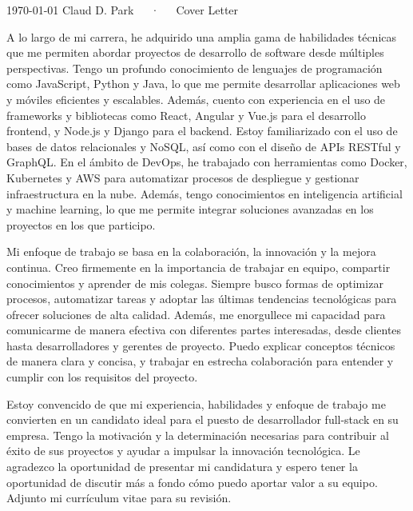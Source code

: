 \documentclass[11pt, a4paper]{awesome-cv}
\begin{document}
\makecvheader[R]

\makecvfooter
  {\today}
  {Claud D. Park~~~·~~~Cover Letter}
  {}

\makelettertitle

\begin{cvletter}

A lo largo de mi carrera, he adquirido una amplia gama de habilidades técnicas que me permiten abordar proyectos de desarrollo de software desde múltiples perspectivas. Tengo un profundo conocimiento de lenguajes de programación como JavaScript, Python y Java, lo que me permite desarrollar aplicaciones web y móviles eficientes y escalables.
Además, cuento con experiencia en el uso de frameworks y bibliotecas como React, Angular y Vue.js para el desarrollo frontend, y Node.js y Django para el backend. Estoy familiarizado con el uso de bases de datos relacionales y NoSQL, así como con el diseño de APIs RESTful y GraphQL.
En el ámbito de DevOps, he trabajado con herramientas como Docker, Kubernetes y AWS para automatizar procesos de despliegue y gestionar infraestructura en la nube. Además, tengo conocimientos en inteligencia artificial y machine learning, lo que me permite integrar soluciones avanzadas en los proyectos en los que participo.

Mi enfoque de trabajo se basa en la colaboración, la innovación y la mejora continua. Creo firmemente en la importancia de trabajar en equipo, compartir conocimientos y aprender de mis colegas. Siempre busco formas de optimizar procesos, automatizar tareas y adoptar las últimas tendencias tecnológicas para ofrecer soluciones de alta calidad.
Además, me enorgullece mi capacidad para comunicarme de manera efectiva con diferentes partes interesadas, desde clientes hasta desarrolladores y gerentes de proyecto. Puedo explicar conceptos técnicos de manera clara y concisa, y trabajar en estrecha colaboración para entender y cumplir con los requisitos del proyecto.

Estoy convencido de que mi experiencia, habilidades y enfoque de trabajo me convierten en un candidato ideal para el puesto de desarrollador full-stack en su empresa. Tengo la motivación y la determinación necesarias para contribuir al éxito de sus proyectos y ayudar a impulsar la innovación tecnológica.
Le agradezco la oportunidad de presentar mi candidatura y espero tener la oportunidad de discutir más a fondo cómo puedo aportar valor a su equipo. Adjunto mi currículum vitae para su revisión.

\end{cvletter}


\makeletterclosing
\end{document}
